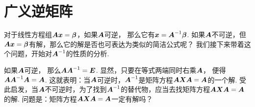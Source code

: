 \section{广义逆矩阵}
对于线性方程组\(\vb{A} \vb{x} = \vb\beta\)，如果\(\vb{A}\)可逆，
那么它有\(\vb{x} = \vb{A}^{-1} \vb\beta\).
如果\(\vb{A}\)不可逆，但\(\vb{A} \vb{x} = \vb\beta\)有解，那么它的解是否也可表达为类似的简洁公式呢？
我们接下来带着这个问题，开始对\(\vb{A}^{-1}\)的性质的分析.

如果\(\vb{A}\)可逆，
那么\(\vb{A} \vb{A}^{-1} = \vb{E}\).
显然，只要在等式两端同时右乘\(\vb{A}\)，
便得\(\vb{A} \vb{A}^{-1} \vb{A} = \vb{A}\).
这就表明：当\(\vb{A}\)可逆时，\(\vb{A}^{-1}\)是矩阵方程\(\vb{A} \vb{X} \vb{A} = \vb{A}\)的一个解.
受此启发，当\(\vb{A}\)不可逆时，为了找到\(\vb{A}^{-1}\)的替代物，应当去找矩阵方程\(\vb{A} \vb{X} \vb{A} = \vb{A}\)的解.
问题是：矩阵方程\(\vb{A} \vb{X} \vb{A} = \vb{A}\)一定有解吗？

